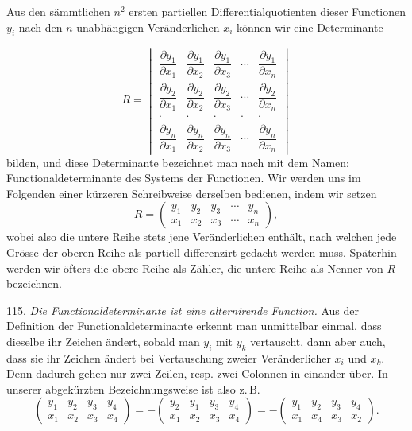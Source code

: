 Aus den sämmtlichen $n^2$ ersten partiellen Differentialquotienten dieser Functionen $y_i$ nach den $n$ unabhängigen Veränderlichen $x_i$ können wir eine Determinante


\[
R=\begin{vmatrix}
\dfrac{\partial y_1}{\partial x_1} & \dfrac{\partial y_1}{\partial x_2} & \dfrac{\partial y_1}{\partial x_3} & \cdots & \dfrac{\partial y_1}{\partial x_n}\\[2ex]
\dfrac{\partial y_2}{\partial x_1} & \dfrac{\partial y_2}{\partial x_2} & \dfrac{\partial y_2}{\partial x_3} & \cdots & \dfrac{\partial y_2}{\partial x_n}\\[1.5ex]
\cdot & \cdot & \cdot & \cdot & \cdot\\[1ex]
\dfrac{\partial y_n}{\partial x_1} & \dfrac{\partial y_n}{\partial x_2} & \dfrac{\partial y_n}{\partial x_3} & \cdots & \dfrac{\partial y_n}{\partial x_n}
\end{vmatrix}
\]
bilden, und diese Determinante bezeichnet man nach  mit dem Namen: Functionaldeterminante des Systems der Functionen. Wir werden uns im Folgenden einer kürzeren Schreibweise derselben bedienen, indem wir setzen
\[
R=\begin{pmatrix} y_1 & y_2 & y_3 & \cdots & y_n\\ x_1 & x_2 & x_3 & \cdots & x_n \end{pmatrix},
\]
wobei also die untere Reihe stets jene Veränderlichen enthält, nach welchen jede Grösse der oberen Reihe als partiell differenzirt gedacht werden muss. Späterhin werden wir öfters die obere Reihe als Zähler, die untere Reihe als Nenner von $R$ bezeichnen.

115. \textit{Die Functionaldeterminante ist eine alternirende Function.} Aus der Definition der Functionaldeterminante erkennt man unmittelbar einmal, dass dieselbe ihr Zeichen ändert, sobald man $y_i$ mit $y_k$ vertauscht, dann aber auch, dass sie ihr Zeichen ändert bei Vertauschung zweier Veränderlicher $x_i$ und $x_k$. Denn dadurch gehen nur zwei Zeilen, resp. zwei Colonnen in einander über. In unserer abgekürzten Bezeichnungsweise ist also z.\,B.
\[
\begin{pmatrix} y_1 & y_2 & y_3 & y_4\\ x_1 & x_2 & x_3 & x_4 \end{pmatrix}
=-\begin{pmatrix} y_2 & y_1 & y_3 & y_4\\ x_1 & x_2 & x_3 & x_4 \end{pmatrix}
=-\begin{pmatrix} y_1 & y_2 & y_3 & y_4\\ x_1 & x_4 & x_3 & x_2 \end{pmatrix}.
\]

